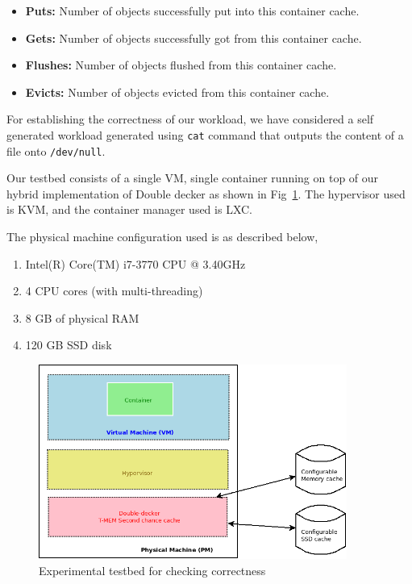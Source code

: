 	  \begin{itemize}
	   
	   \item \textbf{Puts:} Number of objects successfully put into this container cache.
	   \item \textbf{Gets:} Number of objects successfully got from this container cache.
	   \item \textbf{Flushes:} Number of objects flushed from this container cache.
	   \item \textbf{Evicts:} Number of objects evicted from this container cache.
	   
	  \end{itemize}	  
	  
	
      \label{section:correctness_workload}
	For establishing the correctness of our workload, we have considered a self generated workload generated using \texttt{cat} command 
	that outputs the content of a file onto \texttt{/dev/null}.
	
	Our testbed consists of a single VM, single container running on top of our hybrid implementation of Double decker as shown 
	in Fig~\ref{img:correctness_testbed}. The hypervisor used is KVM, and the container manager used is LXC.  
	
	
	\noindent The physical machine configuration used is as described below,
	  \begin{enumerate}
	   \item Intel(R) Core(TM) i7-3770 CPU @ 3.40GHz
	   \item 4 CPU cores (with multi-threading)
	   \item 8 GB of physical RAM
	   \item 120 GB SSD disk
	  \end{enumerate}

	
	\begin{figure}
	  \centering
	  \includegraphics[width=0.9\textwidth]{images/correctness/exp_setup.png}
	  \caption{Experimental testbed for checking correctness}
	  \label{img:correctness_testbed}
	\end{figure}
  
